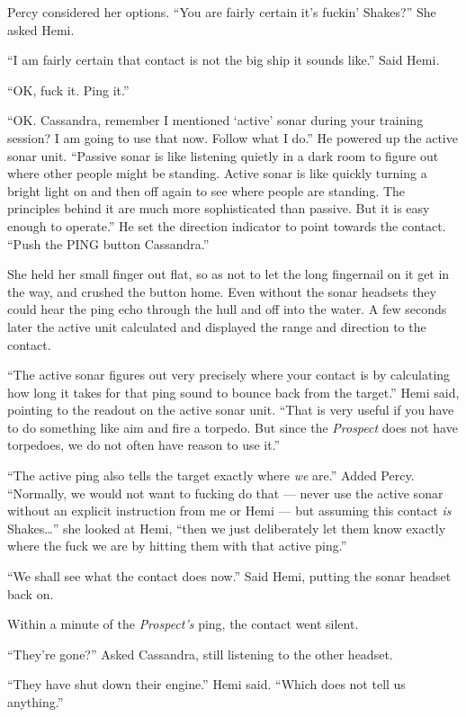 \documentclass[]{scrbook}
\begin{document}
Percy considered her options. ``You are fairly certain it's fuckin'
Shakes?'' She asked Hemi.

``I am fairly certain that contact is not the big ship it sounds like.''
Said Hemi.

``OK, fuck it. Ping it.''

``OK. Cassandra, remember I mentioned `active' sonar during your
training session? I am going to use that now. Follow what I do.'' He
powered up the active sonar unit. ``Passive sonar is like listening
quietly in a dark room to figure out where other people might be
standing. Active sonar is like quickly turning a bright light on and
then off again to see where people are standing. The principles behind
it are much more sophisticated than passive. But it is easy enough to
operate.'' He set the direction indicator to point towards the contact.
``Push the PING button Cassandra.''

She held her small finger out flat, so as not to let the long fingernail
on it get in the way, and crushed the button home. Even without the
sonar headsets they could hear the ping echo through the hull and off
into the water. A few seconds later the active unit calculated and
displayed the range and direction to the contact.

``The active sonar figures out very precisely where your contact is by
calculating how long it takes for that ping sound to bounce back from
the target.'' Hemi said, pointing to the readout on the active sonar
unit. ``That is very useful if you have to do something like aim and
fire a torpedo. But since the \emph{Prospect} does not have torpedoes,
we do not often have reason to use it.''

``The active ping also tells the target exactly where \emph{we} are.''
Added Percy. ``Normally, we would not want to fucking do that --- never
use the active sonar without an explicit instruction from me or Hemi ---
but assuming this contact \emph{is} Shakes\ldots{}'' she looked at Hemi,
``then we just deliberately let them know exactly where the fuck we are
by hitting them with that active ping.''

``We shall see what the contact does now.'' Said Hemi, putting the sonar
headset back on.

Within a minute of the \emph{Prospect's} ping, the contact went silent.

``They're gone?'' Asked Cassandra, still listening to the other headset.

``They have shut down their engine.'' Hemi said. ``Which does not tell
us anything.''
\end{document}
